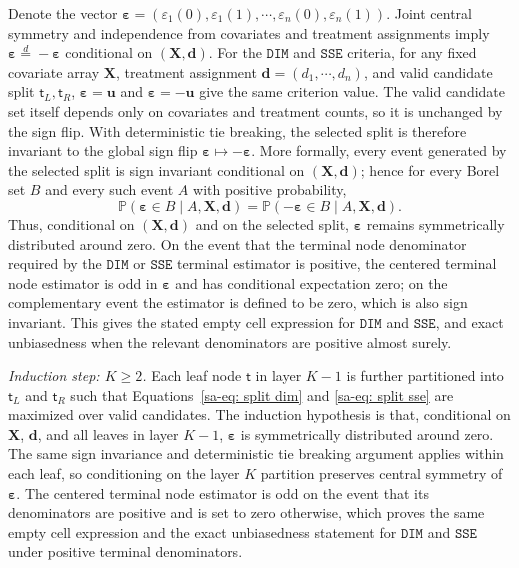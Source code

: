 \documentclass[10pt]{article}
\def\nodet{\mathsf{t}}
\def\bu{\mathbf{u}}
\def\bvarepsilon{\boldsymbol{\varepsilon}}
\def\P{\mathbb{P}}
\def\DIM{\mathtt{DIM}}
\def\SSE{\mathtt{SSE}}
\theoremstyle{definition}
\theoremstyle{remark}
\begin{document}
Denote the vector $\bvarepsilon = (\varepsilon_1(0), \varepsilon_1(1), \cdots, \varepsilon_n(0), \varepsilon_n(1))$. Joint central symmetry and independence from covariates and treatment assignments imply $\bvarepsilon\stackrel{d}{=}-\bvarepsilon$ conditional on $(\mathbf X,\mathbf d)$. For the $\DIM$ and $\SSE$ criteria, for any fixed covariate array $\mathbf X$, treatment assignment $\mathbf{d} = (d_1, \cdots, d_n)$, and valid candidate split $\nodet_L, \nodet_R$, $\bvarepsilon = \bu$ and $\bvarepsilon = - \bu$ give the same criterion value. The valid candidate set itself depends only on covariates and treatment counts, so it is unchanged by the sign flip. With deterministic tie breaking, the selected split is therefore invariant to the global sign flip $\bvarepsilon\mapsto-\bvarepsilon$. More formally, every event generated by the selected split is sign invariant conditional on $(\mathbf X,\mathbf d)$; hence for every Borel set $B$ and every such event $A$ with positive probability,
\[
    \P(\bvarepsilon\in B\mid A,\mathbf X,\mathbf d)
    =
    \P(-\bvarepsilon\in B\mid A,\mathbf X,\mathbf d).
\]
Thus, conditional on $(\mathbf X,\mathbf d)$ and on the selected split, $\bvarepsilon$ remains symmetrically distributed around zero. On the event that the terminal node denominator required by the $\DIM$ or $\SSE$ terminal estimator is positive, the centered terminal node estimator is odd in $\bvarepsilon$ and has conditional expectation zero; on the complementary event the estimator is defined to be zero, which is also sign invariant. This gives the stated empty cell expression for $\DIM$ and $\SSE$, and exact unbiasedness when the relevant denominators are positive almost surely.

\textit{Induction step: $K \geq 2$.} Each leaf node $\nodet$ in layer $K-1$ is further partitioned into $\nodet_L$ and $\nodet_R$ such that Equations~\eqref{sa-eq: split dim} and \eqref{sa-eq: split sse} are maximized over valid candidates. The induction hypothesis is that, conditional on $\mathbf X$, $\mathbf{d}$, and all leaves in layer $K-1$, $\bvarepsilon$ is symmetrically distributed around zero. The same sign invariance and deterministic tie breaking argument applies within each leaf, so conditioning on the layer $K$ partition preserves central symmetry of $\bvarepsilon$. The centered terminal node estimator is odd on the event that its denominators are positive and is set to zero otherwise, which proves the same empty cell expression and the exact unbiasedness statement for $\DIM$ and $\SSE$ under positive terminal denominators.
\end{document}
